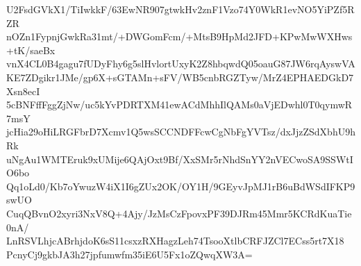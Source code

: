 U2FsdGVkX1/TiIwkkF/63EwNR907gtwkHv2znF1Vzo74Y0WkR1evNO5YiPZf5RZR
nOZn1FypnjGwkRa31mt/+DWGomFcm/+MtsB9HpMd2JFD+KPwMwWXHws+tK/saeBx
vnX4CL0B4gagu7fUDyFhy6g5slHvlortUxyK2Z8hbqwdQ05oauG87JW6rqAyswVA
KE7ZDgikr1JMe/gp6X+sGTAMn+sFV/WB5cnbRGZTyw/MrZ4EPHAEDGkD7Xsn8ecI
5cBNFffFggZjNw/uc5kYvPDRTXM41ewACdMhhIlQAMs0aVjEDwhl0T0qymwR7msY
jcHia29oHiLRGFbrD7Xcmv1Q5wsSCCNDFFcwCgNbFgYVTsz/dxJjzZSdXbhU9hRk
uNgAu1WMTEruk9xUMije6QAjOxt9Bf/XxSMr5rNhdSnYY2nVECwoSA9SSWtIO6bo
Qq1oLd0/Kb7oYwuzW4iX1I6gZUx2OK/OY1H/9GEyvJpMJ1rB6uBdWSdIFKP9swUO
CuqQBvnO2xyri3NxV8Q+4Ajy/JzMsCzFpovxPF39DJRm45Mmr5KCRdKuaTie0nA/
LnRSVLhjcABrhjdoK6sS11csxzRXHagzLeh74TsooXtlbCRFJZCl7ECss5rt7X18
PcnyCj9gkbJA3h27jpfumwfm35iE6U5Fx1oZQwqXW3A=
